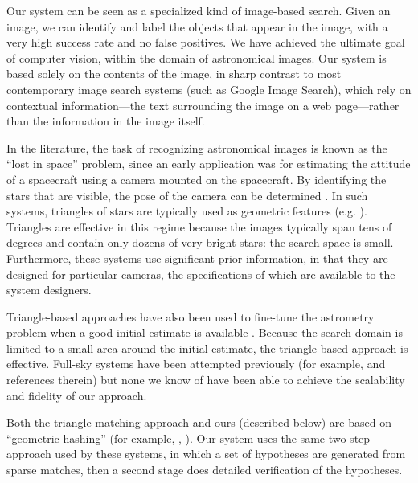 

Our system can be seen as a specialized kind of image-based search.
Given an image, we can identify and label the objects that appear in
the image, with a very high success rate and no false positives.  We
have achieved the ultimate goal of computer vision, within the domain
of astronomical images.  Our system is based solely on the contents of
the image, in sharp contrast to most contemporary image search systems
(such as Google Image Search), which rely on contextual
information---the text surrounding the image on a web page---rather
than the information in the image itself.





In the literature, the task of recognizing astronomical images is
known as %
the ``lost in space''
problem, since an early application was for estimating the attitude of
a spacecraft using a camera mounted on the spacecraft.  By identifying
the stars that are visible, the pose of the camera can be determined
\cite{liebe1993}.  In such systems, triangles of stars are typically
used as geometric features (e.g. \cite{junkins1977}).  Triangles are
effective in this regime because the images typically span tens of
degrees and contain only dozens of very bright stars: the search space
is small.  Furthermore, these systems use significant prior information,
in that they are designed for particular cameras, the specifications of which
are available to the system designers.


Triangle-based approaches have also been used to fine-tune the astrometry
problem when a good initial estimate is available \cite{pal2006}.
Because the search domain is limited to a small area around the
initial estimate, the triangle-based approach is effective.
Full-sky systems have been attempted previously (for example,
\cite{harvey2004} and references therein) but none we know of have been
able to achieve the scalability and fidelity of our approach.


Both the triangle matching approach and ours (described below) are
based on ``geometric hashing'' (for example, \cite{lamdan1990},
\cite{huttenlocher1990}).  Our system uses the same two-step
approach used by these systems, in which a set of hypotheses are
generated from sparse matches, then a second stage does detailed
verification of the hypotheses.



